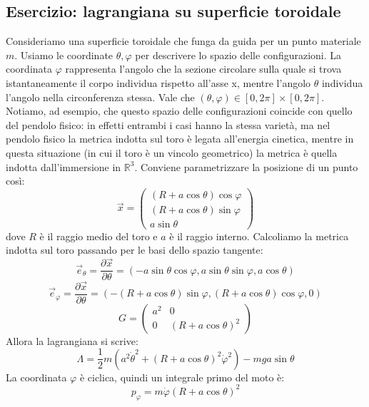 \documentclass[a4paper,openany]{article}
\begin{document}
	\subsection{Esercizio: lagrangiana su superficie toroidale}
	Consideriamo una superficie toroidale che funga da guida per un punto materiale $m$. Usiamo le coordinate $\theta,\varphi$ per descrivere lo spazio delle configurazioni. La coordinata $\varphi$ rappresenta l'angolo che la sezione circolare sulla quale si trova istantaneamente il corpo individua rispetto all'asse x, mentre l'angolo $\theta$ individua l'angolo nella circonferenza stessa. Vale che $(\theta,\varphi) \in [0,2\pi]\times[0,2\pi]$. Notiamo, ad esempio, che questo spazio delle configurazioni coincide con quello del pendolo fisico: in effetti entrambi i casi hanno la stessa varietà, ma nel pendolo fisico la metrica indotta sul toro è legata all'energia cinetica, mentre in questa situazione (in cui il toro è un vincolo geometrico) la metrica è quella indotta dall'immersione in $\mathbb{R}^{3}$. Conviene parametrizzare la posizione di un punto così:
	\begin{equation}\label{key}
		\vec{x} = 
		\begin{pmatrix}
			(R+a\cos\theta)\cos\varphi \\
			(R+a\cos\theta)\sin\varphi \\
			a\sin\theta
		\end{pmatrix}
	\end{equation}
	dove $R$ è il raggio medio del toro e $a$ è il raggio interno. Calcoliamo la metrica indotta sul toro passando per le basi dello spazio tangente:
	$$
	\vec{e}_{\theta} = \dfrac{\partial \vec{x}}{\partial \theta} = (-a\sin\theta\cos\varphi, a\sin\theta\sin\varphi, a\cos\theta)
	$$
	$$
	\vec{e}_{\varphi} = \dfrac{\partial \vec{x}}{\partial \theta} = (-(R+a\cos\theta)\sin\varphi, (R+a\cos\theta)\cos\varphi, 0)
	$$
	\begin{equation}\label{key}
		G = 
		\begin{pmatrix}
			a^2 & 0 \\
			0 & (R+a\cos\theta)^2 
		\end{pmatrix}
	\end{equation}
	Allora la lagrangiana si scrive:
	\begin{equation}\label{key}
		\Lambda = \dfrac{1}{2}m(a^{2}\dot{\theta}^{2}+(R+a\cos\theta)^{2}\dot{\varphi}^{2}) - mga\sin\theta
	\end{equation}
	La coordinata $\varphi$ è ciclica, quindi un integrale primo del moto è:
	$$
	p_{\varphi} = m\dot{\varphi}(R+a\cos\theta)^{2}
	$$
\end{document}
